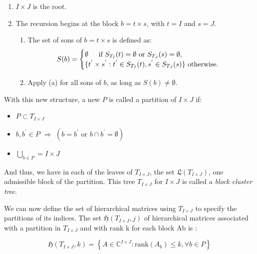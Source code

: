 \begin{enumerate}
    \item $I \times J$ is the root.
    \item The recursion begins at the block $b = t \times s$, with $t = I$ and $s = J$.
          \begin{enumerate}
              \item The set of sons of $b = t \times s$ is defined as:
                    $$
                        S(b) =
                        \begin{cases}
                            \emptyset \hspace{4mm} \text{ if } S_{T_{I}}(t) = \emptyset \text{ or } S_{T_{J}}(s)=\emptyset, \\
                            \{t^{'}\times s^{'}:t^{'}\in S_{T_{I}}(t), s^{'}\in S_{T_{J}}(s)\}  \text{ otherwise.}
                        \end{cases}
                    $$
              \item Apply (a) for all sons of $b$, as long as $S(b) \neq \emptyset$.
          \end{enumerate}
\end{enumerate}

With this new structure, a new $P$ is called a partition of $I \times J$ if:

\begin{itemize}
    \item $P \subset T_{I \times J}$
    \item $b, b^{'} \in P$ \hspace{1mm} $\Rightarrow$ \hspace{1mm} $(b=b^{'} \text{ or }b\cap b^{'}=\emptyset )$
    \item $\bigcup_{b\in P} = I \times J$
\end{itemize}

And thus, we have in each of the leaves of $T_{I \times J}$, the set $\mathfrak{L}(T_{I \times J})$, one admissible block of the partition. This tree $T_{I \times J}$ for $I \times J$ is called a \textit{block cluster tree}.


We can now define the set of hierarchical matrices using $T_{I \times J}$ to specify the partitions of its indices. The set $\mathfrak{H}(T_{I \times J},j)$ of hierarchical matrices associated with a partition in $T_{I \times J}$ and with rank k for each block \gls{Ab} is :

\begin{equation}\label{eq:matrix_hier}
    \mathfrak{H}(T_{I \times J},k) = \left\{  A\in \mathbb{C}^{I\times J} : \text{rank}(A_{b}) \leq k, \forall b \in P \right\}
\end{equation}

